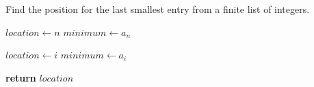 \documentclass[a4paper, 12pt]{article}
\begin{document}
	
	\begin{algorithm}

		\renewcommand{\thealgorithm}{3.1.18}
		
		\caption{Find the position for the last smallest entry from a finite list of integers.}
		
		\begin{algorithmic}[1]
			
			
			\State $location \gets n$
			\State $minimum \gets a_n$
			
					\State $location \gets i$
					\State $minimum \gets a_i$
				\EndIf
			\EndFor
			
			
			\State \textbf{return} $location$
			\EndProcedure
			
		\end{algorithmic}

	\end{algorithm}
\end{document}
